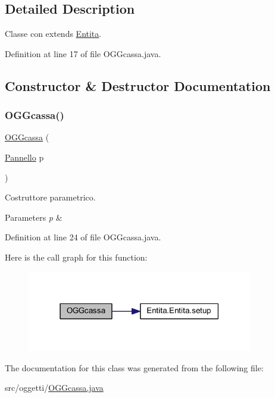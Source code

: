 \subsection{Detailed Description}
Classe con extends \hyperlink{namespace_entita}{Entita}. 

Definition at line 17 of file O\+G\+Gcassa.\+java.



\subsection{Constructor \& Destructor Documentation}
\mbox{\label{classoggetti_1_1_o_g_gcassa_a392992c0ff0bc4643c39ed9485ef91fa}} 
\subsubsection{\texorpdfstring{O\+G\+Gcassa()}{OGGcassa()}}
{\footnotesize\ttfamily \hyperlink{classoggetti_1_1_o_g_gcassa}{O\+G\+Gcassa} (\begin{DoxyParamCaption}\item[{\hyperlink{classa_1_1survival_1_1game_1_1_pannello}{Pannello}}]{p }\end{DoxyParamCaption})}



Costruttore parametrico. 


\begin{DoxyParams}{Parameters}
{\em p} & \\
\hline
\end{DoxyParams}


Definition at line 24 of file O\+G\+Gcassa.\+java.

Here is the call graph for this function\+:
\nopagebreak
\begin{figure}[H]
\begin{center}
\leavevmode
\includegraphics[width=279pt]{classoggetti_1_1_o_g_gcassa_a392992c0ff0bc4643c39ed9485ef91fa_cgraph}
\end{center}
\end{figure}


The documentation for this class was generated from the following file\+:\begin{DoxyCompactItemize}
\item 
src/oggetti/\hyperlink{_o_g_gcassa_8java}{O\+G\+Gcassa.\+java}\end{DoxyCompactItemize}
